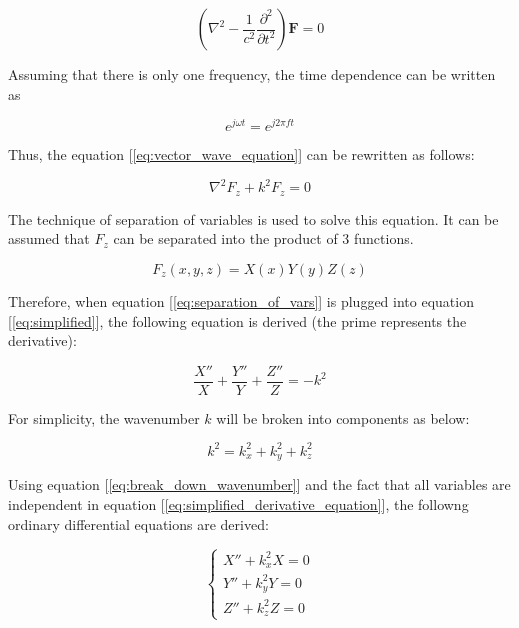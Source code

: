 \documentclass[a4paper,12pt]{report}
\begin{document}
\begin{equation} \label{eq:vector_wave_equation}
  (\nabla^2 - \frac{1}{c^2}\frac{\partial^2}{\partial t^2})\boldsymbol{F} = 0
\end{equation}

Assuming that there is only one frequency, the time dependence can be written as

\begin{equation}
  e^{j\omega t} = e^{j 2\pi ft}
\end{equation}

Thus, the equation [\ref{eq:vector_wave_equation}] can be rewritten as follows:

\begin{equation} \label{eq:simplified}
  \nabla ^ 2 F_z + k^2 F_z = 0
\end{equation}

The technique of separation of variables is used to solve this equation.
It can be assumed that $F_z$ can be separated into the product of 3 functions.

\begin{equation} \label{eq:separation_of_vars}
  F_z(x,y,z) = X(x)Y(y)Z(z)
\end{equation}

Therefore, when equation [\ref{eq:separation_of_vars}] is plugged into equation [\ref{eq:simplified}],
the following equation is derived
(the prime represents the derivative):

\begin{equation} \label{eq:simplified_derivative_equation}
  \frac{X''}{X} + \frac{Y''}{Y} + \frac{Z''}{Z} = -k^2
\end{equation}

For simplicity, the wavenumber $k$ will be broken into components as below:

\begin{equation} \label{eq:break_down_wavenumber}
  k^2 = k_x^2 + k_y^2 + k_z^2
\end{equation}

Using equation [\ref{eq:break_down_wavenumber}] and the fact that all variables are
independent in equation [\ref{eq:simplified_derivative_equation}],
the followng ordinary differential equations are derived:

\begin{equation} \label{eq:three_ordinary}
  \left\{
  \begin{alignedat}{3}
    X'' + k_x^2 X = 0 \\
    Y'' + k_y^2 Y = 0 \\
    Z'' + k_z^2 Z = 0
  \end{alignedat}
  \right.
\end{equation}
\end{document}
